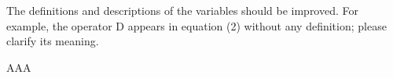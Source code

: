 \begin{point}
	The definitions and descriptions of the variables should be improved. For example, the operator D appears in equation (2) without any definition; please clarify its meaning.
\end{point}

\begin{reply}
	AAA
\end{reply}

